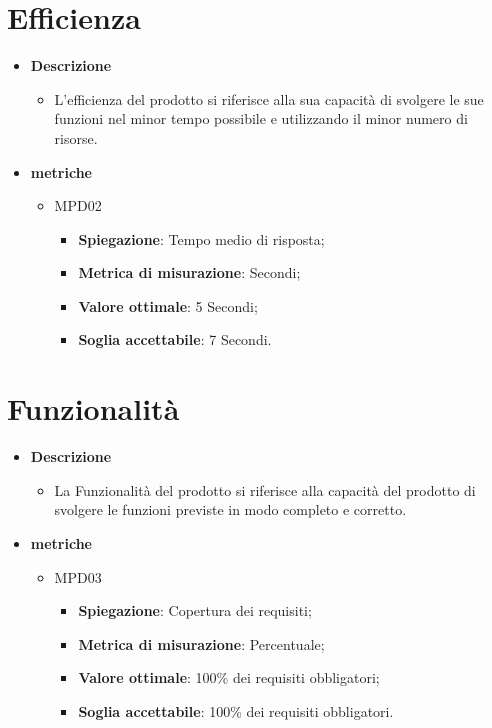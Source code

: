 \section{Efficienza}
\begin{itemize}
    \item \textbf{Descrizione}
    \begin{itemize}
        \item L'efficienza del prodotto si riferisce alla sua capacità di svolgere le sue funzioni nel minor tempo possibile e utilizzando il minor numero di risorse.
    \end{itemize}
    
    \item \textbf{metriche}
    \begin{itemize}
        \item MPD02
        \begin{itemize}
\item \textbf{Spiegazione}: Tempo medio di risposta;
        \item \textbf{Metrica di misurazione}: Secondi;
        \item \textbf{Valore ottimale}: 5 Secondi;
        \item \textbf{Soglia accettabile}: 7 Secondi.
        \end{itemize}
    \end{itemize}
    \end{itemize}

\section{Funzionalità}
\begin{itemize}
    \item \textbf{Descrizione}
    \begin{itemize}
        \item La Funzionalità del prodotto si riferisce alla capacità del prodotto di svolgere le funzioni previste in modo completo e corretto.
    \end{itemize}
    
    \item \textbf{metriche}
    \begin{itemize}
        \item MPD03
        \begin{itemize}
            \item \textbf{Spiegazione}: Copertura dei requisiti;
        \item \textbf{Metrica di misurazione}: Percentuale;
        \item \textbf{Valore ottimale}: 100\% dei requisiti obbligatori;
        \item \textbf{Soglia accettabile}: 100\% dei requisiti obbligatori.
        \end{itemize}
    \end{itemize}
    \end{itemize}
    
